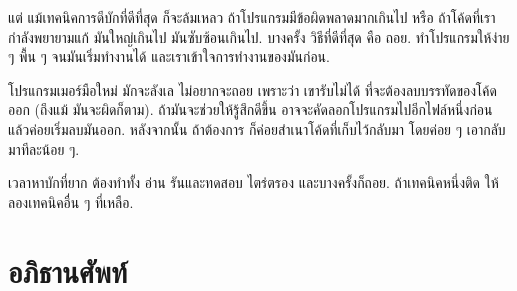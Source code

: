
แต่ แม้เทคนิคการดีบักที่ดีที่สุด ก็จะล้มเหลว ถ้าโปรแกรมมีข้อผิดพลาดมากเกินไป
หรือ ถ้าโค้ดที่เรากำลังพยายามแก้ มันใหญ่เกินไป มันซับซ้อนเกินไป.
บางครั้ง วิธีที่ดีที่สุด คือ ถอย.
ทำโปรแกรมให้ง่าย ๆ พื้น ๆ จนมันเริ่มทำงานได้ และเราเข้าใจการทำงานของมันก่อน.


โปรแกรมเมอร์มือใหม่ มักจะลังเล ไม่อยากจะถอย 
เพราะว่า เขารับไม่ได้ ที่จะต้องลบบรรทัดของโค้ดออก (ถึงแม้ มันจะผิดก็ตาม).
ถ้ามันจะช่วยให้รู้สึกดีขึ้น อาจจะคัดลอกโปรแกรมไปอีกไฟล์หนึ่งก่อน
แล้วค่อยเริ่มลบมันออก.
หลังจากนั้น ถ้าต้องการ ก็ค่อยสำเนาโค้ดที่เก็บไว้กลับมา โดยค่อย ๆ เอากลับมาทีละน้อย ๆ.


เวลาหาบักที่ยาก ต้องทำทั้ง อ่าน รันและทดสอบ ไตร่ตรอง
และบางครั้งก็ถอย.
ถ้าเทคนิคหนึ่งติด ให้ลองเทคนิคอื่น ๆ ที่เหลือ.

\section{อภิธานศัพท์}

